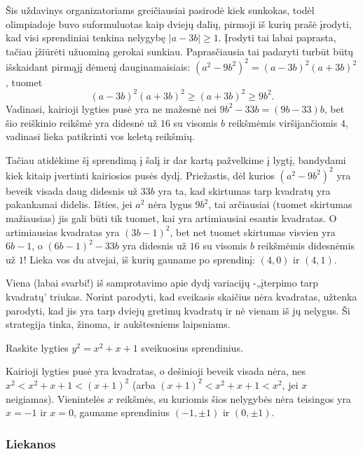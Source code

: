 \begin{sprendimas}
Šis uždavinys organizatoriams greičiausiai pasirodė kiek sunkokas, todėl
olimpiadoje buvo suformuluotas kaip dviejų dalių, pirmoji iš kurių prašė
įrodyti, kad visi sprendiniai tenkina nelygybę $|a-3b|\geq 1$. Įrodyti tai
labai paprasta, tačiau įžiūrėti užuominą gerokai sunkiau. Paprasčiausia tai
padaryti turbūt būtų išskaidant pirmąjį dėmenį dauginamaisiais: $(a^2 -
9b^2)^2 = (a-3b)^2(a+3b)^2$, tuomet
$$(a-3b)^2(a+3b)^2 \geq (a+3b)^2\geq 9b^2.$$
Vadinasi, kairioji lygties pusė yra ne mažesnė nei $9b^2 - 33b=(9b-33)b$, bet
šio reiškinio reikšmė yra didesnė už $16$ su visomis $b$ reikšmėmis
viršijančiomis $4$, vadinasi lieka patikrinti vos keletą reikšmių.

Tačiau atidėkime šį sprendimą į šalį ir dar kartą pažvelkime į lygtį,
bandydami kiek kitaip įvertinti kairiosios pusės dydį. Priežastis, dėl
kurios $(a^2-9b^2)^2$ yra beveik visada daug didesnis už $33b$ yra
ta, kad skirtumas tarp kvadratų yra pakankamai didelis. Išties, jei
$a^2$ nėra lygus $9b^2$, tai arčiausiai (tuomet skirtumas mažiausias) jis
gali būti tik tuomet, kai yra artimiausiai esantis kvadratas. O
artimiausias kvadratas yra $(3b-1)^2$, bet net tuomet skirtumas visvien yra
$6b-1$, o $(6b-1)^2 - 33b$ yra didesnis už $16$ su visomis $b$ reikšmėmis
didesnėmis už $1$! Lieka vos du atvejai, iš kurių gauname po sprendinį:
$(4,0)$ ir $(4,1)$.
\end{sprendimas}

Viena (labai svarbi!) iš samprotavimo apie dydį variacijų -„įterpimo tarp
kvadratų' triukas. Norint parodyti, kad sveikasis skaičius nėra kvadratas,
užtenka parodyti, kad jis yra tarp dviejų gretimų kvadratų ir nė vienam iš
jų nelygus. Ši strategija tinka, žinoma, ir aukštesniems laipsniams.

\begin{pav} Raskite lygties $y^2 = x^2 + x + 1$ sveikuosius sprendinius.
\end{pav}

\begin{sprendimas}
Kairioji lygties pusė yra kvadratas, o dešinioji beveik visada nėra, nes
$x^2 < x^2 + x + 1 < (x+1)^2$ (arba $(x+1)^2 < x^2 + x + 1 < x^2$, jei $x$
neigiamas).  Vienintelės $x$ reikšmės, su kuriomis šios nelygybės nėra
teisingos yra $x=-1$ ir $x=0$, gauname sprendinius $(-1, \pm 1)$ ir $(0,
\pm 1)$.
\end{sprendimas}

\subsubsection{Liekanos}

